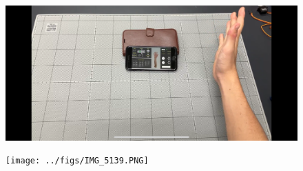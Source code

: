 \documentclass{ltjsreport}
\begin{document}
		\begin{figure}[H]
		\centering
		\begin{minipage}{0.4\columnwidth}
		\centering
		\includegraphics[width = \columnwidth]{../figs/IMG_5138.PNG}
		\end{minipage}
		\hspace{0.04\columnwidth}
		\begin{minipage}{0.4\columnwidth}
		\centering
		\texttt{[image: ../figs/IMG\_5139.PNG]}
		\end{minipage}
		\caption{}
		\end{figure}
\end{document}
